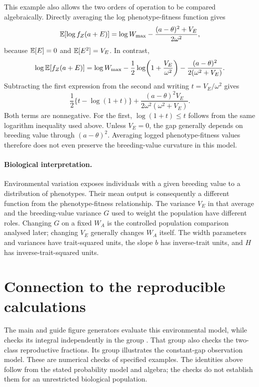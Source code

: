 This example also allows the two orders of operation to be compared
algebraically. Directly averaging the log phenotype-fitness function gives
\[
 \mathbb E[\log f_Z(a+E)]
 =\log W_{\max}-\frac{(a-\theta)^2+V_E}{2\omega^2},
\]
because \(\mathbb E[E]=0\) and \(\mathbb E[E^2]=V_E\). In contrast,
\[
 \log\mathbb E[f_Z(a+E)]
 =\log W_{\max}
  -\frac12\log\!\left(1+\frac{V_E}{\omega^2}\right)
  -\frac{(a-\theta)^2}{2(\omega^2+V_E)}.
\]
Subtracting the first expression from the second and writing
\(t=V_E/\omega^2\) gives
\begin{equation}
 \frac12\{t-\log(1+t)\}
 +\frac{(a-\theta)^2V_E}{2\omega^2(\omega^2+V_E)}.
 \label{conditioning:environment_jensen_gap}
\end{equation}
Both terms are nonnegative. For the first, \(\log(1+t)\leq t\) follows from
the same logarithm inequality used above. Unless \(V_E=0\), the gap generally
depends on breeding value through \((a-\theta)^2\). Averaging logged
phenotype-fitness values therefore does not even preserve the breeding-value
curvature in this model.

\paragraph{Biological interpretation.}
Environmental variation exposes individuals with a given breeding value to a
distribution of phenotypes. Their mean output is consequently a different
function from the phenotype-fitness relationship. The variance \(V_E\) in that
average and the breeding-value variance \(G\) used to weight the population
have different roles. Changing \(G\) on a fixed \(W_A\) is the controlled
population comparison analysed later; changing \(V_E\) generally changes
\(W_A\) itself. The width parameters and variances have trait-squared units,
the slope \(b\) has inverse-trait units, and \(H\) has inverse-trait-squared
units.

\section{Connection to the reproducible calculations}

The main and guide figure generators evaluate this environmental model, while
 checks its integral
independently in the group . That group also
checks the two-class reproductive fractions. Its
 group illustrates the constant-gap observation
model. These are numerical checks of specified examples. The identities above
follow from the stated probability model and algebra; the checks do not
establish them for an unrestricted biological population.
